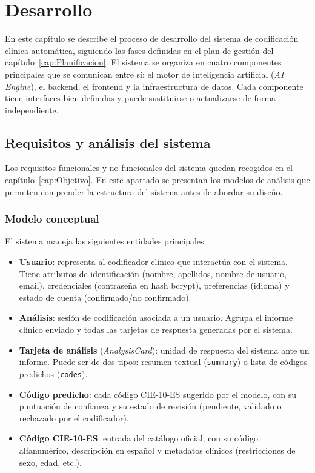 \chapter{Desarrollo}
\label{cap:Desarrollo}

En este capítulo se describe el proceso de desarrollo del sistema de codificación clínica automática, siguiendo las fases definidas en el plan de gestión del capítulo~\ref{cap:Planificacion}. El sistema se organiza en cuatro componentes principales que se comunican entre sí: el motor de inteligencia artificial (\emph{AI Engine}), el backend, el frontend y la infraestructura de datos. Cada componente tiene interfaces bien definidas y puede sustituirse o actualizarse de forma independiente.

\section{Requisitos y análisis del sistema}

Los requisitos funcionales y no funcionales del sistema quedan recogidos en el capítulo~\ref{cap:Objetivo}. En este apartado se presentan los modelos de análisis que permiten comprender la estructura del sistema antes de abordar su diseño.

\subsection{Modelo conceptual}

El sistema maneja las siguientes entidades principales:

\begin{itemize}
 \item \textbf{Usuario}: representa al codificador clínico que interactúa con el sistema. Tiene atributos de identificación (nombre, apellidos, nombre de usuario, email), credenciales (contraseña en hash bcrypt), preferencias (idioma) y estado de cuenta (confirmado/no confirmado).
 \item \textbf{Análisis}: sesión de codificación asociada a un usuario. Agrupa el informe clínico enviado y todas las tarjetas de respuesta generadas por el sistema.
 \item \textbf{Tarjeta de análisis} (\emph{AnalysisCard}): unidad de respuesta del sistema ante un informe. Puede ser de dos tipos: resumen textual (\texttt{summary}) o lista de códigos predichos (\texttt{codes}).
 \item \textbf{Código predicho}: cada código CIE-10-ES sugerido por el modelo, con su puntuación de confianza y su estado de revisión (pendiente, validado o rechazado por el codificador).
 \item \textbf{Código CIE-10-ES}: entrada del catálogo oficial, con su código alfanumérico, descripción en español y metadatos clínicos (restricciones de sexo, edad, etc.).
\end{itemize}

